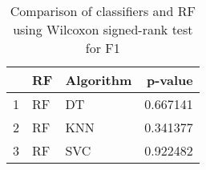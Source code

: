 \begin{table}
\footnotesize
\caption{Comparison of classifiers and RF using Wilcoxon signed-rank test for F1}
\label{tab:RF wilcoxon F1 comparison}
\begin{tabular}{lllr}
\hline
 & RF & Algorithm & p-value \\
\hline
1 & RF & DT & 0.667141 \\
2 & RF & KNN & 0.341377 \\
3 & RF & SVC & 0.922482 \\
\hline
\end{tabular}
\end{table}
